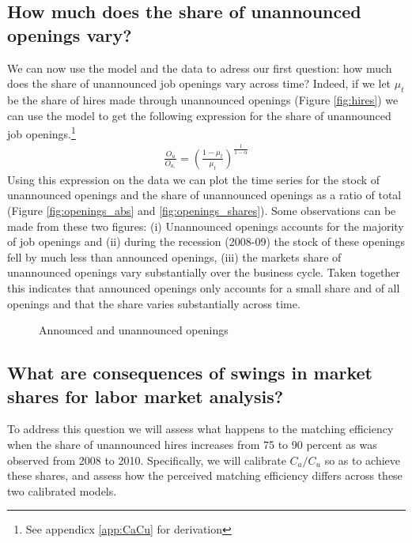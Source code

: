 \documentclass[11pt,article]{memoir}
\begin{document}
\subsection{How much does the share of unannounced openings vary?}
We can now use the model and the data to adress our first question: how much does the share of unannounced job openings vary across time? Indeed, if we let $\mu_t$ be the share of hires made through unannounced openings (Figure \ref{fig:hires}) we can use the model to get the following expression for the share of unannounced job openings.\footnote{See appendicx \ref{app:CaCu} for derivation}
\begin{align}
\frac{O_u}{O_{a,}}=\left( \frac{1-\mu_t}{\mu_t} \right)^{\frac{1}{1-\alpha}}
\end{align}
Using this expression on the data we can plot the time series for the stock of unannounced openings and the share of unannounced openings as a ratio of total (Figure \ref{fig:openings_abs} and \ref{fig:openings_shares}). Some observations can be made from these two figures: (i) Unannounced openings accounts for the majority of job openings and (ii) during the recession (2008-09) the stock of these openings fell by much less than announced openings, (iii) the markets share of unannounced openings vary substantially over the business cycle. Taken together this indicates that announced openings only accounts for a small share and of all openings and that the share varies substantially across time.


\begin{figure}[h!]
	\caption{Announced and unannounced openings}
\end{figure}


\subsection{What are consequences of swings in market shares for labor market analysis?}

To address this question we will assess what happens to the matching efficiency when the share of unannounced hires increases from 75 to 90 percent as was observed from 2008 to 2010. Specifically, we will calibrate $C_a/C_u$ so as to achieve these shares, and assess how the perceived matching efficiency differs across these two calibrated models.
\end{document}
